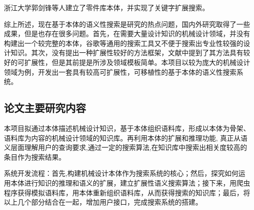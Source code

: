 \documentclass[12pt,a4paper]{article}
\begin{document}
	浙江大学郭剑锋\cite{22}等人建立了零件库本体，并实现了关键字扩展搜索。

	综上所述，现在基于本体的语义性搜索是研究的热点问题，国内外研究取得了一些成果，但是也存在很多问题。首先，在需要大量设计知识的机械设计领域，并没有构建出一个较完整的本体，谷歌等通用的搜索工具又不便于搜索出专业性较强的设计知识。其次，没有提出一种扩展性较好的方法框架，文献\cite{15}中提到了其方法具有较好的可扩展性，但是其前提是所涉及领域模板简单。本项目以较为庞大的机械设计领域为例，开发出一套具有较高可扩展性，可移植性的基于本体的语义性搜索系统。
		
	\subsection{论文主要研究内容}
	本项目拟通过本体描述机械设计知识，基于本体组织语料库，形成以本体为骨架、语料库为内容的机械设计领域的知识库。再利用本体的扩展和推理功能, 真正从语义层面理解用户的查询要求,通过一定的搜索算法,在知识库中搜索出相关度较高的条目作为搜索结果。
	
	系统开发流程：首先,构建机械设计本体作为搜索系统的核心；然后，探究如何运用本体进行知识的推理和语义的扩展，建立扩展性语义搜索算法；接下来，用爬虫程序获得模拟语料库，用本体重新组织语料库，从而获得搜索的知识库；最后，将以上几个部分结合在一起，增加用户接口，完成搜索系统的搭建。
\end{document}
